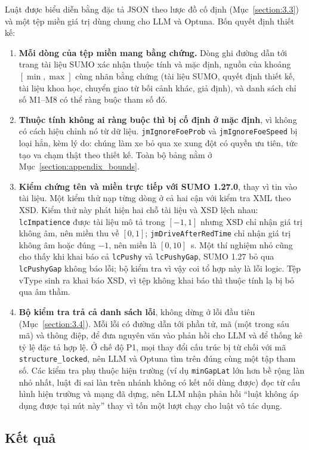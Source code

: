 \documentclass[../DoAn.tex]{subfiles}
\begin{document}
Luật được biểu diễn bằng đặc tả JSON theo lược đồ cố định (Mục~\ref{section:3.3}) và một tệp miền giá trị dùng chung cho LLM và Optuna. Bốn quyết định thiết kế:
\begin{enumerate}[label=(\arabic*)]
    \item \textbf{Mỗi dòng của tệp miền mang bằng chứng.} Dòng ghi đường dẫn tới trang tài liệu SUMO xác nhận thuộc tính và mặc định, nguồn của khoảng $[\min,\max]$ cùng nhãn bằng chứng (tài liệu SUMO, quyết định thiết kế, tài liệu khoa học, chuyển giao từ bối cảnh khác, giả định), và danh sách chỉ số M1--M8 có thể ràng buộc tham số đó.
    \item \textbf{Thuộc tính không ai ràng buộc thì bị cố định ở mặc định}, vì không có cách hiệu chỉnh nó từ dữ liệu. \texttt{jmIgnoreFoeProb} và \texttt{jmIgnoreFoeSpeed} bị loại hẳn, kèm lý do: chúng làm xe bỏ qua xe xung đột có quyền ưu tiên, tức tạo va chạm thật theo thiết kế. Toàn bộ bảng nằm ở Mục~\ref{section:appendix_bounds}.
    \item \textbf{Kiểm chứng tên và miền trực tiếp với SUMO 1.27.0}, thay vì tin vào tài liệu. Một kiểm thử nạp từng dòng ở cả hai cận với kiểm tra XML theo XSD. Kiểm thử này phát hiện hai chỗ tài liệu và XSD lệch nhau: \texttt{lcImpatience} được tài liệu mô tả trong $[-1,1]$ nhưng XSD chỉ nhận giá trị không âm, nên miền thu về $[0,1]$; \texttt{jmDriveAfterRedTime} chỉ nhận giá trị không âm hoặc đúng $-1$, nên miền là $[0,10]$~s. Một thí nghiệm nhỏ cũng cho thấy khi khai báo cả \texttt{lcPushy} và \texttt{lcPushyGap}, SUMO 1.27 bỏ qua \texttt{lcPushyGap} không báo lỗi; bộ kiểm tra vì vậy coi tổ hợp này là lỗi logic. Tệp vType sinh ra khai báo XSD, vì tệp không khai báo thì thuộc tính lạ bị bỏ qua âm thầm.
    \item \textbf{Bộ kiểm tra trả cả danh sách lỗi}, không dừng ở lỗi đầu tiên (Mục~\ref{section:3.4}). Mỗi lỗi có đường dẫn tới phần tử, mã (một trong sáu mã) và thông điệp, để đưa nguyên văn vào phản hồi cho LLM và để thống kê tỷ lệ đặc tả hợp lệ. Ở chế độ P1, mọi thay đổi cấu trúc bị từ chối với mã \texttt{structure\_locked}, nên LLM và Optuna tìm trên đúng cùng một tập tham số. Các kiểm tra phụ thuộc hiện trường (ví dụ \texttt{minGapLat} lớn hơn bề rộng làn nhỏ nhất, luật đi sai làn trên nhánh không có kết nối dùng được) đọc từ cấu hình hiện trường và mạng đã dựng, nên LLM nhận phản hồi ``luật không áp dụng được tại nút này'' thay vì tốn một lượt chạy cho luật vô tác dụng.
\end{enumerate}

\subsection{Kết quả}
\end{document}
